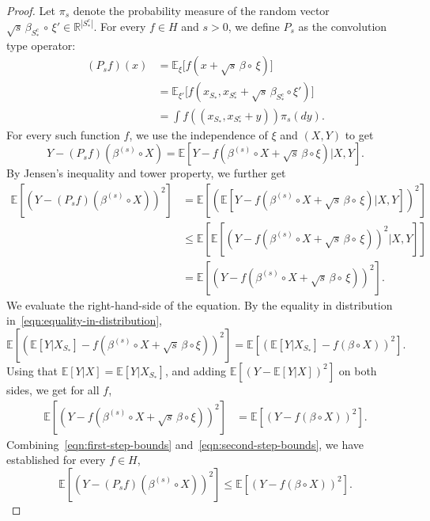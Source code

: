 \documentclass[sn-mathphys-num]{sn-jnl}%
\numberwithin{equation}{section}
\newcommand{\R}{\mathbb{R}}
\newcommand{\E}{\mathbb{E}}
\theoremstyle{thmstyleone}%
\theoremstyle{thmstyletwo}%
\theoremstyle{thmstylethree}%
\begin{document}
\begin{proof}
Let $\pi_s$ denote the probability measure of the random vector $\sqrt{s} \, \beta_{S_*^c} \,\circ\, \xi' \in \R^{|S_*^c|}$. 
For every $f \in H$ and $s > 0$, we define $P_s$ as the convolution type operator: 
\begin{equation*}
\begin{split} 
	(P_s f)(x) &= \E_\xi \big[ f(x + \sqrt{s} \, \beta \circ \,\xi) \big] \\
	&= \E_{\xi'} \big[ f(x_{S_*}, x_{S_*^c} + \sqrt{s} \, \beta_{S_*^c} \circ \xi') \big] \\
		&= \int f((x_{S_*}, x_{S_*^c}+ y)) \pi_s(dy).
\end{split} 
\end{equation*} 
For every such function $f$, we use the independence of $\xi$ and $(X, Y)$ to get 
\begin{equation*}
	Y - (P_s f)(\beta^{(s)} \circ X) = \E [Y- f(\beta^{(s)} \circ X+ \sqrt{s} \, \beta \circ \xi)|X, Y ].
\end{equation*} 
By Jensen's inequality and tower property, we further get  
\begin{equation}
\label{eqn:first-step-bounds}
\begin{split} 
	\E[(Y - (P_s f)(\beta^{(s)} \circ X))^2] &= \E [(\E [Y- f(\beta^{(s)} \circ X+ \sqrt{s} \, \beta \circ \, \xi)|X, Y ])^2] \\
				&\le \E[ \E[(Y- f(\beta^{(s)} \circ X+ \sqrt{s} \, \beta \circ \, \xi))^2 |X, Y]] \\
				&= \E[(Y- f(\beta^{(s)} \circ X+ \sqrt{s} \, \beta \circ \, \xi))^2 ].
\end{split} 
\end{equation} 
We evaluate the right-hand-side of the equation. 
By the equality in distribution in~\eqref{eqn:equality-in-distribution}, 
\begin{equation*}
	\E[(\E[Y|X_{S_*}]- f(\beta^{(s)} \circ X+ \sqrt{s} \, \beta \circ \xi))^2] =  \E[(\E[Y|X_{S_*}]- f(\beta \circ X))^2].
\end{equation*}
Using that $\E[Y|X] = \E[Y|X_{S_*}]$, and adding $\E[(Y-\E[Y|X])^2]$ on both sides, we get for all $f$, 
\begin{equation}
\label{eqn:second-step-bounds}
\begin{split} 
 \E[(Y- f(\beta^{(s)} \circ X+ \sqrt{s} \, \beta \circ \xi))^2] 	&= \E[(Y - f(\beta \circ X))^2].
\end{split}
\end{equation} 
Combining~\eqref{eqn:first-step-bounds} and~\eqref{eqn:second-step-bounds}, we have established for every $f \in H$,
\begin{equation}
\label{eqn:summary-of-first-part}
	\E[(Y - (P_s f)(\beta^{(s)} \circ X))^2]	\le  \E[(Y - f(\beta \circ X))^2].
\end{equation}




\end{proof}
\end{document}
